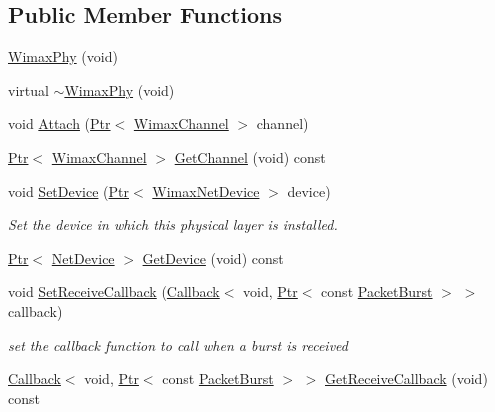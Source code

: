 \subsection*{Public Member Functions}
\begin{DoxyCompactItemize}
\item 
\hyperlink{classns3_1_1WimaxPhy_afb59a12d1d4eb78a33ca0929900cbc37}{Wimax\+Phy} (void)
\item 
virtual \hyperlink{classns3_1_1WimaxPhy_a6a0291f74097828a3544b7fcf71a2e1e}{$\sim$\+Wimax\+Phy} (void)
\item 
void \hyperlink{classns3_1_1WimaxPhy_a3adfde80658dbb7dce265343f9232803}{Attach} (\hyperlink{classns3_1_1Ptr}{Ptr}$<$ \hyperlink{classns3_1_1WimaxChannel}{Wimax\+Channel} $>$ channel)
\item 
\hyperlink{classns3_1_1Ptr}{Ptr}$<$ \hyperlink{classns3_1_1WimaxChannel}{Wimax\+Channel} $>$ \hyperlink{classns3_1_1WimaxPhy_a178bf19461a73be0251443af2204e0ac}{Get\+Channel} (void) const 
\item 
void \hyperlink{classns3_1_1WimaxPhy_a500a3a7774a395bfb33f321d1192562c}{Set\+Device} (\hyperlink{classns3_1_1Ptr}{Ptr}$<$ \hyperlink{classns3_1_1WimaxNetDevice}{Wimax\+Net\+Device} $>$ device)
\begin{DoxyCompactList}\small\item\em Set the device in which this physical layer is installed. \end{DoxyCompactList}\item 
\hyperlink{classns3_1_1Ptr}{Ptr}$<$ \hyperlink{classns3_1_1NetDevice}{Net\+Device} $>$ \hyperlink{classns3_1_1WimaxPhy_a3a9c4f8c46bce1b81807bbfa802662c8}{Get\+Device} (void) const 
\item 
void \hyperlink{classns3_1_1WimaxPhy_a5e026302143085bc650d49454e2307c9}{Set\+Receive\+Callback} (\hyperlink{classns3_1_1Callback}{Callback}$<$ void, \hyperlink{classns3_1_1Ptr}{Ptr}$<$ const \hyperlink{classns3_1_1PacketBurst}{Packet\+Burst} $>$ $>$ callback)
\begin{DoxyCompactList}\small\item\em set the callback function to call when a burst is received \end{DoxyCompactList}\item 
\hyperlink{classns3_1_1Callback}{Callback}$<$ void, \hyperlink{classns3_1_1Ptr}{Ptr}$<$ const \hyperlink{classns3_1_1PacketBurst}{Packet\+Burst} $>$ $>$ \hyperlink{classns3_1_1WimaxPhy_a8a12079f36299cbde241b9dcd5ce66fe}{Get\+Receive\+Callback} (void) const 
\item 

\end{DoxyCompactItemize}
